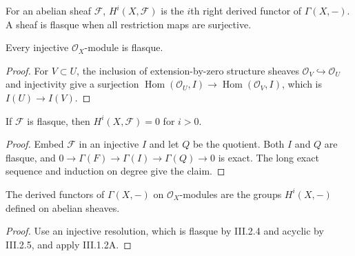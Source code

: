 \begin{definition}
\label{ha-ch3-def-cohomology-flasque}
For an abelian sheaf $\mathcal F$, $H^i(X,\mathcal F)$ is the $i$th right
derived functor of $\Gamma(X,-)$.  A sheaf is flasque when all restriction
maps are surjective.
\end{definition}
\begin{lemma}
\label{ha-ch3-lem-injective-flasque}
Every injective $\mathcal O_X$-module is flasque.

\end{lemma}
\begin{proof}

For $V\subset U$, the inclusion of extension-by-zero structure sheaves
$\mathcal O_V\hookrightarrow\mathcal O_U$ and injectivity give a surjection
$\operatorname{Hom}(\mathcal O_U,I)\to\operatorname{Hom}(\mathcal O_V,I)$,
which is $I(U)\to I(V)$.

\end{proof}
\begin{proposition}
\label{ha-ch3-prop-flasque-acyclic}
If $\mathcal F$ is flasque, then $H^i(X,\mathcal F)=0$ for $i>0$.

\end{proposition}
\begin{proof}

Embed $\mathcal F$ in an injective $I$ and let $Q$ be the quotient.  Both
$I$ and $Q$ are flasque, and $0\to\Gamma(F)\to\Gamma(I)\to\Gamma(Q)\to0$
is exact.  The long exact sequence and induction on degree give the claim.

\end{proof}
\begin{proposition}
\label{ha-ch3-prop-cohomology-derived}
The derived functors of $\Gamma(X,-)$ on $\mathcal O_X$-modules are the
groups $H^i(X,-)$ defined on abelian sheaves.

\end{proposition}
\begin{proof}
Use an injective resolution, which is flasque by III.2.4 and
acyclic by III.2.5, and apply III.1.2A.
\end{proof}
